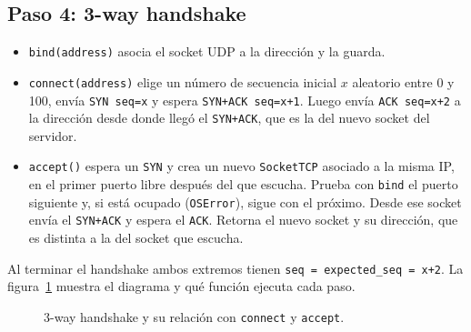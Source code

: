 \documentclass[11pt,letterpaper]{article}
\begin{document}
\subsection{Paso 4: 3-way handshake}

\begin{itemize}[nosep]
  \item \texttt{bind(address)} asocia el socket UDP a la dirección y la guarda.
  \item \texttt{connect(address)} elige un número de secuencia inicial $x$ aleatorio
        entre 0 y 100, envía \texttt{SYN seq=x} y espera \texttt{SYN+ACK seq=x+1}.
        Luego envía \texttt{ACK seq=x+2} a la dirección desde donde llegó el
        \texttt{SYN+ACK}, que es la del nuevo socket del servidor.
  \item \texttt{accept()} espera un \texttt{SYN} y crea un nuevo \texttt{SocketTCP}
        asociado a la misma IP, en el primer puerto libre después del que escucha. Prueba
        con \texttt{bind} el puerto siguiente y, si está ocupado (\texttt{OSError}), sigue
        con el próximo. Desde ese socket envía el \texttt{SYN+ACK} y espera el
        \texttt{ACK}. Retorna el nuevo socket y su dirección, que es distinta a la del
        socket que escucha.
\end{itemize}

Al terminar el handshake ambos extremos tienen \texttt{seq = expected\_seq = x+2}. La
figura~\ref{fig:handshake} muestra el diagrama y qué función ejecuta cada paso.

\begin{figure}[H]
\centering
{}
\caption{3-way handshake y su relación con \texttt{connect} y \texttt{accept}.}
\label{fig:handshake}
\end{figure}
\end{document}
